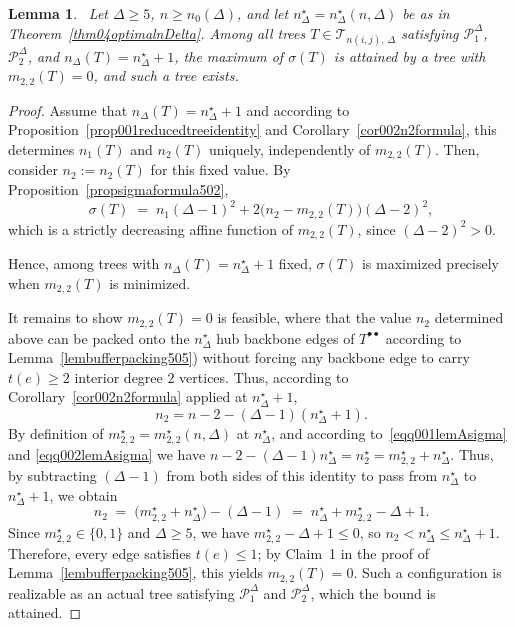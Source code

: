 \documentclass[12pt]{amsart}
\newtheorem{lemma}[theorem]{Lemma}
\newcommand{\TT}{\mathcal{T}}
\begin{document}
\begin{lemma}~\label{lemcompetitorm22zero0066}
Let $\Delta\geqslant 5$, $n\geqslant  n_0(\Delta)$, and let $n_\Delta^\star=n_\Delta^\star(n,\Delta)$
be as in Theorem~\ref{thm04optimalnDelta}. Among all trees $T\in \TT_{n(i,j),\,\Delta}$ satisfying
$\mathcal P_1^\Delta$, $\mathcal P_2^\Delta$, and $n_\Delta(T)=n_\Delta^\star+1$, the
maximum of $\sigma(T)$ is attained by a tree with $m_{2,2}(T)=0$, and such a tree exists.
\end{lemma}
\begin{proof}
Assume that $n_\Delta(T)=n_\Delta^\star+1$ and according to Proposition~\ref{prop001reducedtreeidentity}
and Corollary~\ref{cor002n2formula}, this determines $n_1(T)$ and $n_2(T)$ uniquely, independently of $m_{2,2}(T)$. Then, consider $n_2 := n_2(T)$ for this fixed
value. By Proposition~\ref{propsigmaformula502},
\begin{equation}~\label{eqq001lemAsigma}
\sigma(T) \;=\; n_1(\Delta-1)^2 + 2\big(n_2 - m_{2,2}(T)\big)(\Delta-2)^2,
\end{equation}
which is a strictly decreasing affine function of $m_{2,2}(T)$, since $(\Delta-2)^2>0$. 

Hence, among trees with $n_\Delta(T)=n_\Delta^\star+1$ fixed, $\sigma(T)$ is maximized precisely when $m_{2,2}(T)$ is minimized.

It remains to show $m_{2,2}(T)=0$ is feasible, where that the value
$n_2$ determined above can be packed onto the $n_\Delta^\star$ hub backbone edges of $T^{\bullet\bullet}$  according to Lemma~\ref{lembufferpacking505}) without
forcing any backbone edge to carry $t(e)\geqslant 2$ interior degree $2$ vertices. Thus, according to Corollary~\ref{cor002n2formula} applied at $n_\Delta^\star+1$,
\begin{equation}~\label{eqq002lemAsigma}
n_2 = n-2-(\Delta-1)(n_\Delta^\star+1).
\end{equation}
By definition of $m_{2,2}^\star=m_{2,2}^\star(n,\Delta)$ at $n_\Delta^\star$, and according to~\eqref{eqq001lemAsigma} and \eqref{eqq002lemAsigma} we have
$n-2-(\Delta-1)n_\Delta^\star = n_2^\star = m_{2,2}^\star + n_\Delta^\star$. Thus, by subtracting $(\Delta-1)$ from both sides of this identity to pass from
$n_\Delta^\star$ to $n_\Delta^\star+1$, we obtain 
\begin{equation}~\label{eqq003lemAsigma}
n_2 \;=\; \big(m_{2,2}^\star+n_\Delta^\star\big) - (\Delta-1)
\;=\; n_\Delta^\star + m_{2,2}^\star - \Delta + 1.
\end{equation}
Since $m_{2,2}^\star\in\{0,1\}$ and $\Delta\ge5$, we have
$m_{2,2}^\star-\Delta+1 \leqslant 0$, so
$n_2 < n_\Delta^\star \leqslant n_\Delta^\star+1$. Therefore, every
edge satisfies $t(e)\leqslant 1$; by Claim~1 in the proof of
Lemma~\ref{lembufferpacking505}, this yields $m_{2,2}(T)=0$. Such a
configuration is realizable as an actual tree satisfying $\mathcal P_1^\Delta$ and $\mathcal P_2^\Delta$, which the bound is attained.
\end{proof}
\end{document}
